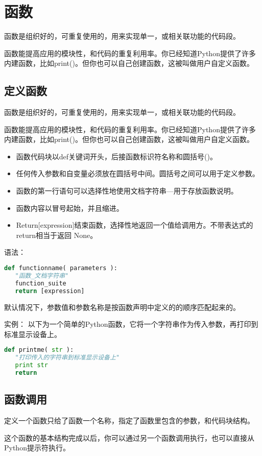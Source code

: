\section{函数}
函数是组织好的，可重复使用的，用来实现单一，或相关联功能的代码段。

函数能提高应用的模块性，和代码的重复利用率。你已经知道Python提供了许多内建函数，比如print()。但你也可以自己创建函数，这被叫做用户自定义函数。


\subsection{定义函数}
函数是组织好的，可重复使用的，用来实现单一，或相关联功能的代码段。

函数能提高应用的模块性，和代码的重复利用率。你已经知道Python提供了许多内建函数，比如print()。但你也可以自己创建函数，这被叫做用户自定义函数。
\begin{itemize}
\item 函数代码块以def关键词开头，后接函数标识符名称和圆括号()。
\item 任何传入参数和自变量必须放在圆括号中间。圆括号之间可以用于定义参数。
\item 函数的第一行语句可以选择性地使用文档字符串—用于存放函数说明。
\item 函数内容以冒号起始，并且缩进。
\item Return[expression]结束函数，选择性地返回一个值给调用方。不带表达式的return相当于返回 None。
\end{itemize}

语法：
\begin{lstlisting}[language=Python]
def functionname( parameters ):
   "函数_文档字符串"
   function_suite
   return [expression]
\end{lstlisting}
默认情况下，参数值和参数名称是按函数声明中定义的的顺序匹配起来的。

实例：
以下为一个简单的Python函数，它将一个字符串作为传入参数，再打印到标准显示设备上。
\begin{lstlisting}[language=Python]
def printme( str ):
   "打印传入的字符串到标准显示设备上"
   print str
   return
\end{lstlisting}


\subsection{函数调用}
定义一个函数只给了函数一个名称，指定了函数里包含的参数，和代码块结构。

这个函数的基本结构完成以后，你可以通过另一个函数调用执行，也可以直接从Python提示符执行。

